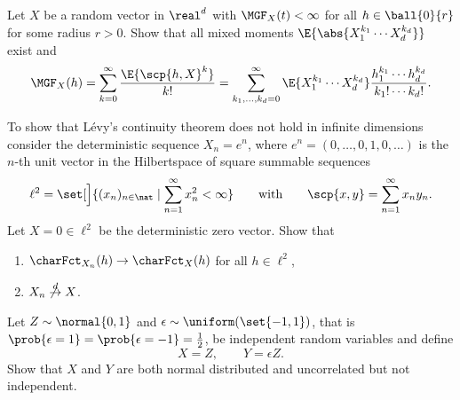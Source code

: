 \begin{exercise}
    \label{ex: multivariate moment generating function}
    Let \(X\) be a random vector in \(\real^d\) with \(\MGF_X(t) < \infty\)
    for all \(h\in \ball{0}{r}\) for some radius \(r > 0\). Show that all mixed moments
    \(\E{\abs{X_1^{k_1} \cdots X_d^{k_d}}}\) exist and
    \[
        \MGF_X(h) = \sum_{k=0}^\infty \frac{\E{\scp{h, X}^k}}{k!}
        = \sum_{k_1, \dots, k_d = 0}^\infty
        \E{X_1^{k_1} \cdots X_d^{k_d}}
        \frac{h_1^{k_1} \cdots h_d^{k_d}}{k_1! \cdots k_d!}.
    \]
\end{exercise}

\begin{exercise}
    \label{ex: counterexample levy's continuity in infinite dim}
    To show that Lévy's continuity theorem does not hold in infinite dimensions
    consider the deterministic sequence \(X_n = e^n\), where \(e^n=(0,\dots,0, 1, 0, \dots)\) is the
    \(n\)-th unit vector in the Hilbertspace of square summable sequences 
    \[
        \ell^2 = \set[\Big]{(x_n)_{n\in \nat} \mid \sum_{n=1}^\infty x_n^2 < \infty}
        \qquad\text{with}\qquad
        \scp{x, y} = \sum_{n=1}^\infty x_n y_n.
    \]
    Let \(X=0\in \ell^2\) be the deterministic zero vector. Show that
    \begin{enumerate}[label=(\alph*), noitemsep]
        \item \(\charFct_{X_n}(h) \to \charFct_{X}(h)\) for all \(h\in \ell^2\),
        \item \(X_n \not\overset{d}\to X\).
    \end{enumerate}
\end{exercise}

\begin{exercise}
    \label{ex: uncorrelated but not independent normal}
    Let \(Z \sim \normal{0,1}\) and \(\epsilon \sim \uniform(\set{-1,1})\), that is \(\prob{\epsilon = 1} = \prob{\epsilon = -1} = \frac{1}{2}\), be independent
    random variables and define
    \[
        X = Z, \qquad Y = \epsilon Z.
    \]
    Show that \(X\) and \(Y\) are both normal distributed and uncorrelated but not independent.
\end{exercise}

